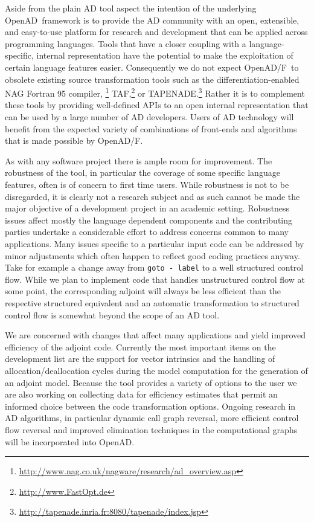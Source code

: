 \documentclass{book}
\newcommand{\OpenADF}{OpenAD/F}
\newcommand{\OpenAD}{OpenAD}
\begin{document}
Aside from the plain AD tool aspect the intention of the 
underlying \OpenAD\  framework is to 
provide the AD community with 
an open, extensible, and easy-to-use platform for research and development
that can be applied across programming languages.
Tools that have a closer coupling with a language-specific, internal representation
have the potential to make the exploitation of certain language features easier. 
Consequently we do not expect \OpenADF\ to obsolete existing source transformation
tools such as  
the differentiation-enabled NAG Fortran 95 
compiler,
\footnote{\url{http://www.nag.co.uk/nagware/research/ad_overview.asp}} 
TAF,\footnote{\url{http://www.FastOpt.de}} 
or TAPENADE.\footnote{\url{http://tapenade.inria.fr:8080/tapenade/index.jsp}} 
Rather it is to
complement these tools by providing well-defined APIs to an open internal 
representation that can be used by a large number of AD developers.
Users of AD technology will benefit from the expected
variety of combinations of front-ends and algorithms that is made possible
by \OpenADF.

As with any software project there is ample room for improvement.
The robustness of the tool, in particular the coverage of 
some specific language features, often is of concern to first 
time users. While robustness is not to be disregarded, it is clearly 
not a research subject and as such cannot be made the major 
objective of a development project in an academic setting. 
Robustness issues affect mostly the language dependent components 
and the contributing parties undertake a considerable effort to 
address concerns common to many applications. Many issues specific 
to a particular input code can be addressed by minor adjustments 
which often happen to reflect good coding practices anyway. 
Take for example a change away from 
\lstinline{goto - label} to a well structured control flow. 
While we plan to  implement code that handles 
unstructured control flow at some point, the corresponding adjoint  will always
be less efficient than the respective structured equivalent and an 
automatic transformation to structured control flow is somewhat beyond the scope
of an AD tool.

We are concerned with changes that affect many applications and yield 
improved efficiency of the adjoint code.
Currently the most important items on the development list are the
support for vector intrinsics and the handling of allocation/deallocation cycles 
during the model computation for the generation of an adjoint model.
Because the tool provides a variety of options to the user we are also 
working on collecting data for efficiency estimates that permit 
an informed choice between the code transformation options. 
Ongoing research in AD algorithms, in particular dynamic call 
graph reversal, more efficient control flow reversal and 
improved elimination techniques in the computational graphs will 
be incorporated into \OpenAD. 
\end{document}
